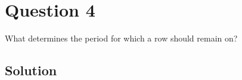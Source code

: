 \section*{Question 4}

What determines the period for which a row should remain on?

\subsection*{Solution}
